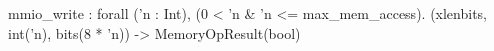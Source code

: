 mmio_write : forall ('n : Int), (0 < 'n & 'n <= max_mem_access).
  (xlenbits, int('n), bits(8 * 'n)) -> MemoryOpResult(bool)